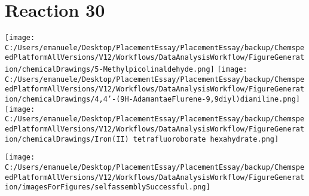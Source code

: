 \documentclass{article}%
\begin{document}
\section*{Reaction 30}%
%
\begin{scheme}[H]%
\begin{minipage}{0.5\textwidth}%
\texttt{[image: C:/Users/emanuele/Desktop/PlacementEssay/PlacementEssay/backup/ChemspeedPlatformAllVersions/V12/Workflows/DataAnalysisWorkflow/FigureGeneration/chemicalDrawings/5-Methylpicolinaldehyde.png]}%
\texttt{[image: C:/Users/emanuele/Desktop/PlacementEssay/PlacementEssay/backup/ChemspeedPlatformAllVersions/V12/Workflows/DataAnalysisWorkflow/FigureGeneration/chemicalDrawings/4,4'-(9H-AdamantaeFlurene-9,9diyl)dianiline.png]}%
\texttt{[image: C:/Users/emanuele/Desktop/PlacementEssay/PlacementEssay/backup/ChemspeedPlatformAllVersions/V12/Workflows/DataAnalysisWorkflow/FigureGeneration/chemicalDrawings/Iron(II) tetrafluoroborate hexahydrate.png]}%
\end{minipage}%
\begin{minipage}{0.5\textwidth}%
\begin{center}%
\texttt{[image: C:/Users/emanuele/Desktop/PlacementEssay/PlacementEssay/backup/ChemspeedPlatformAllVersions/V12/Workflows/DataAnalysisWorkflow/FigureGeneration/imagesForFigures/selfassemblySuccessful.png]}%
\end{center}%
\end{minipage}%
\caption{Self-assembly of components 3, 13, with Iron(II) in a 3.0:1.5:1.0 molar ratio in CH$_3$CN at 60\textdegree C for 40h. These are the reagents (starting materials) for reaction 30.}%
\end{scheme}%
\end{document}
